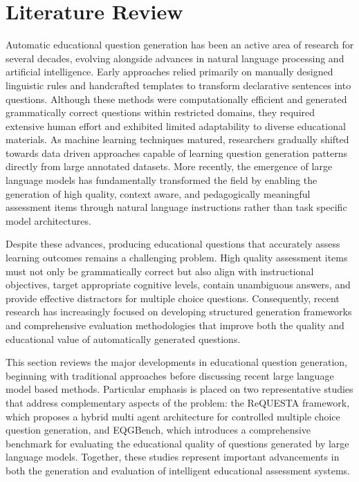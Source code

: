 \section{Literature Review}
\label{sec:litreview}

Automatic educational question generation has been an active area of research for several decades, evolving alongside advances in natural language processing and artificial intelligence. Early approaches relied primarily on manually designed linguistic rules and handcrafted templates to transform declarative sentences into questions. Although these methods were computationally efficient and generated grammatically correct questions within restricted domains, they required extensive human effort and exhibited limited adaptability to diverse educational materials. As machine learning techniques matured, researchers gradually shifted towards data driven approaches capable of learning question generation patterns directly from large annotated datasets. More recently, the emergence of large language models has fundamentally transformed the field by enabling the generation of high quality, context aware, and pedagogically meaningful assessment items through natural language instructions rather than task specific model architectures.

Despite these advances, producing educational questions that accurately assess learning outcomes remains a challenging problem. High quality assessment items must not only be grammatically correct but also align with instructional objectives, target appropriate cognitive levels, contain unambiguous answers, and provide effective distractors for multiple choice questions. Consequently, recent research has increasingly focused on developing structured generation frameworks and comprehensive evaluation methodologies that improve both the quality and educational value of automatically generated questions.

This section reviews the major developments in educational question generation, beginning with traditional approaches before discussing recent large language model based methods. Particular emphasis is placed on two representative studies that address complementary aspects of the problem: the ReQUESTA framework, which proposes a hybrid multi agent architecture for controlled multiple choice question generation, and EQGBench, which introduces a comprehensive benchmark for evaluating the educational quality of questions generated by large language models. Together, these studies represent important advancements in both the generation and evaluation of intelligent educational assessment systems.

